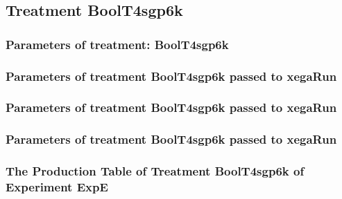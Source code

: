 \documentclass[18pt,c]{beamer}
\makeatletter
\def\beamer@writeslidentry@miniframesoff{%
  \expandafter\beamer@ifempty\expandafter{\beamer@framestartpage}{}%
  {%
   \clearpage\beamer@notesactions%
  }
}
\newcommand*{\miniframesoff}{\let\beamer@writeslidentry=\beamer@writeslidentry@miniframesoff}
\makeatother
\begin{document}
\miniframesoff
\subsection{Treatment BoolT4sgp6k}

 \begin{frame}
 \fontsize{8pt}{9pt}\selectfont
 \frametitle{  Parameters of treatment: BoolT4sgp6k 
 }

 \label{ExpEtParmTable016.tex}  
 \end{frame}


 \begin{frame}
 \fontsize{8pt}{9pt}\selectfont
 \frametitle{  Parameters of treatment BoolT4sgp6k passed to xegaRun
 }

 \label{ExpEtParmTable017.tex}  
 \end{frame}


 \begin{frame}
 \fontsize{8pt}{9pt}\selectfont
 \frametitle{  Parameters of treatment BoolT4sgp6k passed to xegaRun
 }

 \label{ExpEtParmTable018.tex}  
 \end{frame}


 \begin{frame}
 \fontsize{8pt}{9pt}\selectfont
 \frametitle{  Parameters of treatment BoolT4sgp6k passed to xegaRun
 }

 \label{ExpEtParmTable019.tex}  
 \end{frame}

 \begin{frame}
 \fontsize{8pt}{9pt}\selectfont
 \frametitle{ The Production Table of Treatment BoolT4sgp6k of Experiment ExpE }

 \label{ExpEGrammarTable006.tex}  
 \end{frame}
\end{document}
